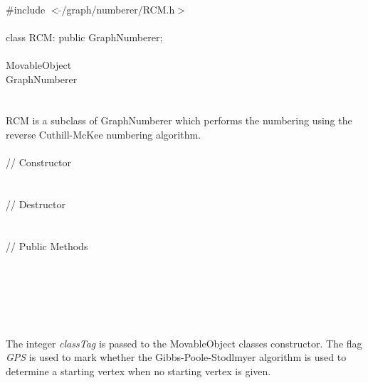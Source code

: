 

   \\
\indent \#include $<\tilde{ }$/graph/numberer/RCM.h$>$  \\

  \\
\indent class RCM: public GraphNumberer; \\

 \\
\indent MovableObject \\
\indent\indent GraphNumberer \\
\indent\indent{} \\

  \\
\indent RCM is a subclass of GraphNumberer which performs the
numbering using the reverse Cuthill-McKee numbering algorithm. \\

  \\
\indent\indent // Constructor  \\
\indent{}  \\ \\
\indent\indent // Destructor  \\
\indent{}  \\ \\
\indent\indent // Public Methods   \\
\indent{}\\
\indent{}\\
\indent{} \\
\indent{} \\

  \\
  \\
The integer {\em classTag} is passed to the MovableObject classes
constructor. The flag {\em GPS} is used to mark whether the
Gibbs-Poole-Stodlmyer algorithm is used to determine a starting vertex
when no starting vertex is given. \\

